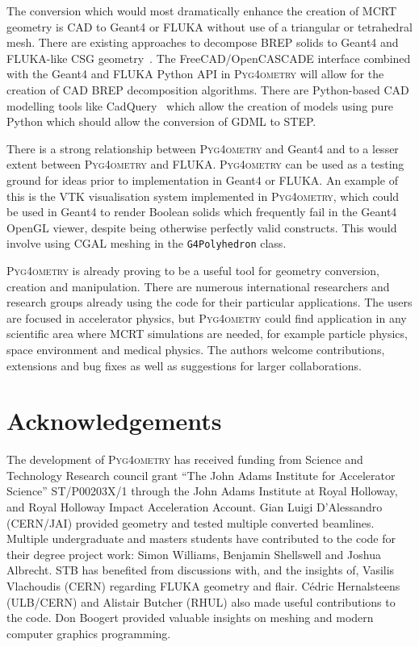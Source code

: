 \documentclass[preprint,12pt]{elsarticle}
\newcommand{\pyinline}[1]{\lstinline[postbreak={}]{#1}}
\newcommand{\PYGEOMETRY}{\textsc{Pyg4ometry}}
\begin{document}
The conversion which would most dramatically enhance the creation of MCRT geometry is CAD to Geant4 or FLUKA
without use of a triangular or tetrahedral mesh. There are existing approaches to decompose BREP solids to Geant4 and
FLUKA-like CSG geometry~\cite{WangNuclSciTech31-82-2020, LuFusionEngineeringAndDesign124-2017}.
The FreeCAD/OpenCASCADE interface combined with the Geant4 and FLUKA Python API in \PYGEOMETRY{}
will allow for the creation of CAD BREP decomposition algorithms. There are Python-based CAD modelling tools like
CadQuery~\cite{cadquery} which allow the creation of models using pure Python which should allow the conversion of GDML to STEP.

There is a strong relationship between \PYGEOMETRY{} and Geant4 and to a lesser extent between
\PYGEOMETRY{} and FLUKA. \PYGEOMETRY{} can be used as a testing ground for ideas prior to
implementation in Geant4 or FLUKA. An example of this is the VTK visualisation system implemented in
\PYGEOMETRY{}, which could be used in Geant4 to render Boolean solids which frequently
fail in the Geant4 OpenGL viewer, despite being otherwise perfectly valid constructs.
This would involve using CGAL meshing in the \pyinline{G4Polyhedron} class. %

\PYGEOMETRY{} is already proving to be a useful tool for geometry conversion, creation and manipulation.
There are numerous international researchers and research groups already using the code for their particular applications.
The users are focused in accelerator physics, but \PYGEOMETRY{} could find application in any scientific
area where MCRT simulations are needed, for example particle physics, space environment and medical physics.
The authors welcome contributions, extensions and bug fixes as well as suggestions for larger collaborations.

\section{Acknowledgements}

The development of \PYGEOMETRY{} has received funding from Science and
Technology Research council grant ``The John Adams Institute for
Accelerator Science'' ST/P00203X/1 through the John Adams Institute at
Royal Holloway, and Royal Holloway Impact Acceleration Account. Gian Luigi D'Alessandro (CERN/JAI)
provided geometry and tested multiple converted beamlines. Multiple
undergraduate and masters students have contributed to the code for their
degree project work: Simon Williams, Benjamin Shellswell and Joshua Albrecht.
STB has benefited from discussions with, and the insights of, Vasilis Vlachoudis
(CERN) regarding FLUKA geometry and flair.  Cédric Hernalsteens (ULB/CERN) and
Alistair Butcher (RHUL) also made useful contributions to the code. Don Boogert
provided valuable insights on meshing and modern computer graphics programming.
\end{document}
